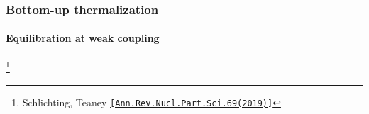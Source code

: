 \documentclass[aspectratio=169,11pt,usenames,dvipsnames]{beamer}
\renewcommand{\thefootnote}{$\star$}
\newcommand\blfootnote[1]{%
  \begingroup
  \renewcommand\thefootnote{}\footnote{#1}%
  \addtocounter{footnote}{-1}%
  \endgroup
}
\begin{document}

\begin{frame}
    \frametitle{Bottom-up thermalization}
    \framesubtitle{Equilibration at weak coupling}
    \blfootnote{\scriptsize Schlichting, Teaney \href{hhttps://doi.org/10.1146/annurev-nucl-101918-023825}{{\color{customblue}\texttt{[Ann.Rev.Nucl.Part.Sci.69(2019)]}}}}
\end{frame}

\end{document}

